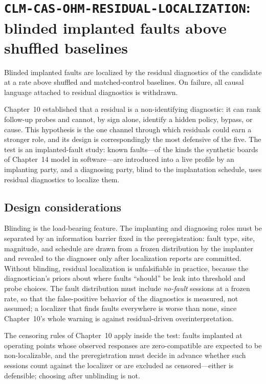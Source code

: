 \section{\texttt{CLM-CAS-OHM-RESIDUAL-LOCALIZATION}: blinded implanted faults above shuffled baselines}\label{hyp:sec:localization}

\begin{hypothesis}\label{hyp:hyp:localization}
Blinded implanted faults are localized by the residual diagnostics of the candidate at a rate above shuffled and matched-control baselines. On failure, all causal language attached to residual diagnostics is withdrawn.
\end{hypothesis}

Chapter~10 established that a residual is a non-identifying diagnostic: it can rank follow-up probes and cannot, by sign alone, identify a hidden policy, bypass, or cause. This hypothesis is the one channel through which residuals could earn a stronger role, and its design is correspondingly the most defensive of the five. The test is an implanted-fault study: known faults---of the kinds the synthetic boards of Chapter~14 model in software---are introduced into a live profile by an implanting party, and a diagnosing party, blind to the implantation schedule, uses residual diagnostics to localize them.

\subsection{Design considerations}

Blinding is the load-bearing feature. The implanting and diagnosing roles must be separated by an information barrier fixed in the preregistration: fault type, site, magnitude, and schedule are drawn from a frozen distribution by the implanter and revealed to the diagnoser only after localization reports are committed. Without blinding, residual localization is unfalsifiable in practice, because the diagnostician's priors about where faults ``should'' be leak into threshold and probe choices. The fault distribution must include \emph{no-fault} sessions at a frozen rate, so that the false-positive behavior of the diagnostics is measured, not assumed; a localizer that finds faults everywhere is worse than none, since Chapter~10's whole warning is against residual-driven overinterpretation.

The censoring rules of Chapter~10 apply inside the test: faults implanted at operating points whose observed responses are zero-compatible are expected to be non-localizable, and the preregistration must decide in advance whether such sessions count against the localizer or are excluded as censored---either is defensible; choosing after unblinding is not.

